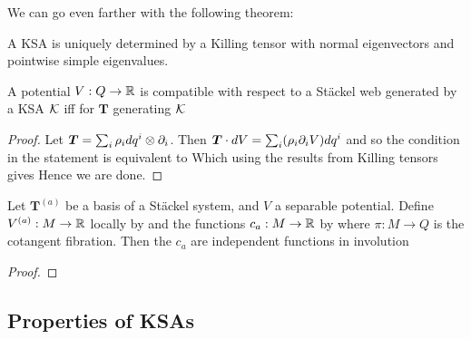 \documentclass{article}
\begin{document}
We can go even farther with the following theorem:

\begin{theorem}
A KSA is uniquely determined by a Killing tensor with normal eigenvectors and pointwise simple eigenvalues.
\end{theorem}


\begin{prop}
A potential $V:Q \to \mathbb{R}$ is compatible with respect to a St\"ackel web generated by a KSA $\mathcal{K}$ iff for $\bm{T}$ generating $\mathcal{K}$
\end{prop}
\begin{proof}
Let $\bm{T} = \sum_i \rho_i dq^i \otimes \partial_i $. Then $\bm{T} \cdot dV = \sum_i (\rho_i \partial_i V) dq^i$ and so the condition in the statement is equivalent to 
Which using the results from Killing tensors gives 
Hence we are done. 
\end{proof}

\begin{prop}
Let $\bm{T}^{(a)}$ be a basis of a St\"ackel system, and $V$ a separable potential. Define $V^{(a)} : M \to \mathbb{R}$ locally by 
and the functions $c_a : M \to \mathbb{R}$ by 
where $\pi : M \to Q$ is the cotangent fibration. Then the $c_a$ are independent functions in involution
\end{prop}
\begin{proof}
\end{proof}

\subsection{Properties of KSAs}
\end{document}
